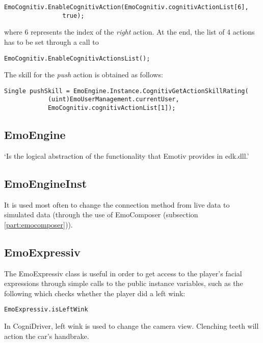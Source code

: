 \begin{Verbatim}[frame=single, framesep=3mm]
EmoCognitiv.EnableCognitivAction(EmoCognitiv.cognitivActionList[6], 
				true);
\end{Verbatim}
		
where 6 represents the index of the \textit{right} action. At the end, the list of 4 actions has to be set through a call to 

\begin{Verbatim}[frame=single, framesep=3mm]
EmoCognitiv.EnableCognitivActionsList();
\end{Verbatim}

The skill for the \textit{push} action is obtained as follows:

\begin{Verbatim}[frame=single, framesep=3mm]
Single pushSkill = EmoEngine.Instance.CognitivGetActionSkillRating(
			(uint)EmoUserManagement.currentUser,
			EmoCognitiv.cognitivActionList[1]); 
\end{Verbatim}

\subsection{EmoEngine}
`Is the logical abstraction of the functionality that Emotiv provides in edk.dll.'\cite{emotivSDKUserManual}

\subsection{EmoEngineInst}
It is used most often to change the connection method from live data to simulated data (through the use of EmoComposer (subsection \ref{part:emocomposer})).

\subsection{EmoExpressiv}
The EmoExpressiv class is useful in order to get access to the player's facial expressions through simple calls to the public instance variables, such as the following which checks whether the player did a left wink:

\begin{Verbatim}[frame=single, framesep=3mm]
EmoExpressiv.isLeftWink
\end{Verbatim}

In CogniDriver, left wink is used to change the camera view. Clenching teeth will action the car's handbrake. 


